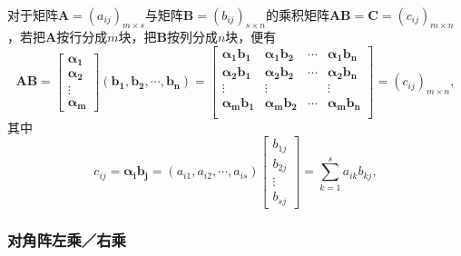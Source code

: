 \paragraph{}
对于矩阵$\bm{A}=(a_{ij})_{m\times s}$与矩阵$\bm{B}=(b_{ij})_{s\times n}$的乘积矩阵$\bm{AB}=\bm{C}=(c_{ij})_{m\times n}$，若把$\bm{A}$按行分成$m$块，把$\bm{B}$按列分成$n$块，便有
\begin{equation*}
  \bm{AB} = \left[\begin{array}{c}
    \bm{\alpha_1} \\
    \bm{\alpha_2} \\
    \vdots \\
    \bm{\alpha_m}
  \end{array}\right](\bm{b_1},\bm{b_2},\cdots,\bm{b_n}) = \left[\begin{array}{cccc}
    \bm{\alpha_1b_1} & \bm{\alpha_1b_2} & \cdots & \bm{\alpha_1b_n} \\
    \bm{\alpha_2b_1} & \bm{\alpha_2b_2} & \cdots & \bm{\alpha_2b_n} \\
    \vdots & \vdots & & \vdots \\
    \bm{\alpha_mb_1} & \bm{\alpha_mb_2} & \cdots & \bm{\alpha_mb_n} \\
  \end{array}\right] = (c_{ij})_{m\times n},
\end{equation*}
其中
\begin{equation*}
  c_{ij} = \bm{\alpha_ib_j} = (a_{i1}, a_{i2} , \cdots , a_{is})\left[\begin{array}{c}
    b_{1j} \\
    b_{2j} \\
    \vdots \\
    b_{sj}
  \end{array}\right] = \sum_{k=1}^sa_{ik}b_{kj},
\end{equation*}

\subsubsection{对角阵左乘／右乘}
